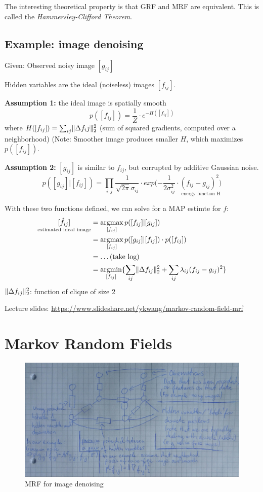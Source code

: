 \documentclass{scrartcl}
\DeclareMathOperator*{\argmin}{argmin} %
\DeclareMathOperator*{\argmax}{argmax} %
\DeclarePairedDelimiter\norm{\lVert}{\rVert}%
\begin{document}
The interesting theoretical property is that GRF and MRF are equivalent. This is called the \textit{Hammersley-Clifford Theorem}.

\bigbreak

\subsection{Example: image denoising}
Given: Observed noisy image \([g_{ij}]\)

Hidden variables are the ideal (noiseless) images \([f_{ij}]\).

\textbf{Assumption 1:} the ideal image is spatially smooth \[p([f_{ij}]) = \frac{1}{Z} \cdot e^{-H([f_{ij}])}\] where \(H([f_{ij}]) = \sum_{ij} \norm{\Delta f_ij}_2^2\) (sum of squared gradients, computed over a neighborhood) (Note: Smoother image produces smaller \(H\), which maximizes \(p([f_{ij}])\).

\textbf{Assumption 2:} \([g_{ij}]\) is similar to \(f_{ij}\), but corrupted by additive Gaussian noise.
\[ p([g_{ij}]|[f_{ij}]) = \prod_{i,j} \frac{1}{\sqrt{2\pi} \sigma_{ij}} \cdot exp(-\frac{1}{2\sigma_{ij}^2} \cdot \underset{\text{energy function H}}{(f_{ij} - g_{ij})^2)}\]

With these two functions defined, we can solve for a MAP estimte for \(f\): 
\begin{align*}
    \underset{\text{estimated ideal image}}{[\hat{f}_{ij}]} &= \argmax_{[f_{ij}]} p([f_{ij}]|[g_{ij}])\\
    &= \argmax_{[f_{ij}]} p([g_{ij}]|[f_{ij}]) \cdot p([f_{ij}])\\
    &= \dots \text{(take log)}\\
    &= \argmin_{[f_{ij}]} \{\sum_{ij} \norm{\Delta f_{ij}}_2^2 + \sum_{ij} \lambda_{ij}(f_{ij} - g_{ij})^2\}
\end{align*}
\(\norm{\Delta f_{ij}}_2^2\): function of clique of size 2

Lecture slides: \url{https://www.slideshare.net/ykwang/markov-random-field-mrf} 

\section{Markov Random Fields}
\begin{figure}[ht]
	\centering
    \includegraphics[scale=0.15]{img/mrf_1.jpg}
	\caption{MRF for image denoising}
	\label{fig:mrf_1}
\end{figure}
\end{document}
